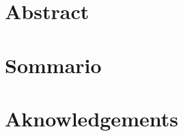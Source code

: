 \chapter*{Abstract}

\chapter*{Sommario}

\chapter*{Aknowledgements}

\tableofcontents
\listoffigures
\listoftables
